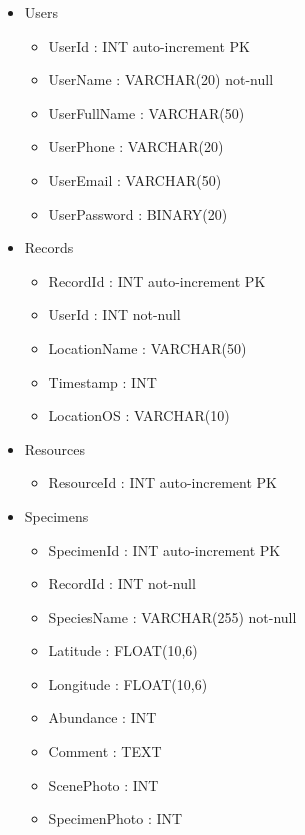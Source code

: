         \begin{itemize}
            \item Users
            \begin{itemize}
                \item UserId : INT auto-increment PK
                \item UserName : VARCHAR(20) not-null
                \item UserFullName : VARCHAR(50)
                \item UserPhone : VARCHAR(20)
                \item UserEmail : VARCHAR(50)
                \item UserPassword : BINARY(20)
            \end{itemize}
                
            \item Records
            \begin{itemize}
                \item RecordId : INT auto-increment PK
                \item UserId : INT not-null
                \item LocationName : VARCHAR(50)
                \item Timestamp : INT
                \item LocationOS : VARCHAR(10)
            \end{itemize}
                
            \item Resources
            \begin{itemize}
                \item ResourceId : INT auto-increment PK
            \end{itemize}

            \item Specimens
            \begin{itemize}
                \item SpecimenId : INT auto-increment PK
                \item RecordId : INT not-null
                \item SpeciesName : VARCHAR(255) not-null
                \item Latitude : FLOAT(10,6)
                \item Longitude : FLOAT(10,6)
                \item Abundance : INT
                \item Comment : TEXT
                \item ScenePhoto : INT
                \item SpecimenPhoto : INT   
            \end{itemize}
            \end{itemize}